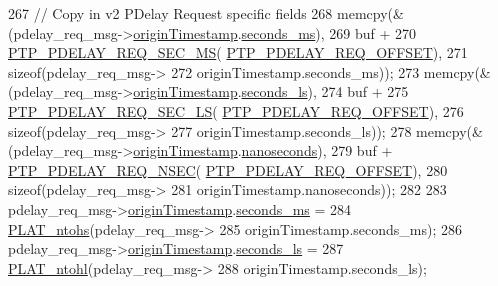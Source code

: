 \begin{DoxyCode}
{{{{{{267             \textcolor{comment}{// Copy in v2 PDelay Request specific fields}
268             memcpy(&(pdelay\_req\_msg->\hyperlink{class_p_t_p_message_path_delay_req_a57a4bfcce938833de582c2ed5138aa3b}{originTimestamp}.\hyperlink{class_timestamp_a5d98378d782519e6f9c17db70f1620f0}{seconds\_ms}),
269                    buf +
270                    \hyperlink{avbts__message_8hpp_a6bca65c57b0e9a4c479d03f73fd91c02}{PTP\_PDELAY\_REQ\_SEC\_MS}(
      \hyperlink{avbts__message_8hpp_a11afdce162945d7ec2f0083eecbd53bd}{PTP\_PDELAY\_REQ\_OFFSET}),
271                    \textcolor{keyword}{sizeof}(pdelay\_req\_msg->
272                       originTimestamp.seconds\_ms));
273             memcpy(&(pdelay\_req\_msg->\hyperlink{class_p_t_p_message_path_delay_req_a57a4bfcce938833de582c2ed5138aa3b}{originTimestamp}.\hyperlink{class_timestamp_a2bf200e58cd268d8b86cf93c51500a44}{seconds\_ls}),
274                    buf +
275                    \hyperlink{avbts__message_8hpp_abc2070b7298e07fa08e983ea488237e4}{PTP\_PDELAY\_REQ\_SEC\_LS}(
      \hyperlink{avbts__message_8hpp_a11afdce162945d7ec2f0083eecbd53bd}{PTP\_PDELAY\_REQ\_OFFSET}),
276                    \textcolor{keyword}{sizeof}(pdelay\_req\_msg->
277                       originTimestamp.seconds\_ls));
278             memcpy(&(pdelay\_req\_msg->\hyperlink{class_p_t_p_message_path_delay_req_a57a4bfcce938833de582c2ed5138aa3b}{originTimestamp}.\hyperlink{class_timestamp_a78ae11d98fcfe738239d0a853d82c84a}{nanoseconds}),
279                    buf + \hyperlink{avbts__message_8hpp_ae113dfd103ed7c7eeea9adecb0a40633}{PTP\_PDELAY\_REQ\_NSEC}(
      \hyperlink{avbts__message_8hpp_a11afdce162945d7ec2f0083eecbd53bd}{PTP\_PDELAY\_REQ\_OFFSET}),
280                    \textcolor{keyword}{sizeof}(pdelay\_req\_msg->
281                       originTimestamp.nanoseconds));
282 
283             pdelay\_req\_msg->\hyperlink{class_p_t_p_message_path_delay_req_a57a4bfcce938833de582c2ed5138aa3b}{originTimestamp}.\hyperlink{class_timestamp_a5d98378d782519e6f9c17db70f1620f0}{seconds\_ms} =
284                 \hyperlink{linux_2src_2platform_8cpp_a6b8f3e7b87b66fa774a07ddc67f883a7}{PLAT\_ntohs}(pdelay\_req\_msg->
285                        originTimestamp.seconds\_ms);
286             pdelay\_req\_msg->\hyperlink{class_p_t_p_message_path_delay_req_a57a4bfcce938833de582c2ed5138aa3b}{originTimestamp}.\hyperlink{class_timestamp_a2bf200e58cd268d8b86cf93c51500a44}{seconds\_ls} =
287                 \hyperlink{linux_2src_2platform_8cpp_ad335681c3444e0406899693a6f782173}{PLAT\_ntohl}(pdelay\_req\_msg->
288                        originTimestamp.seconds\_ls);
}}}}}}
\end{DoxyCode}
